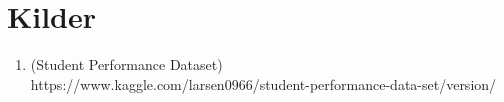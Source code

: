 \newpage
\section{Kilder}

\begin{enumerate}
  \item (Student Performance Dataset) \\
  https://www.kaggle.com/larsen0966/student-performance-data-set/version/
\end{enumerate}